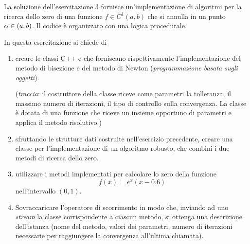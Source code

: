 La soluzione dell'esercitazione 3 fornisce un'implementazione di
algoritmi per la ricerca dello zero di una funzione $f\in
C^{1}\left(a, b\right)$ che si annulla in
un punto $\alpha\in\left( a, b\right)$. Il codice \`e organizzato con una
logica procedurale.

In questa esercitazione si chiede di

\begin{enumerate}
\item creare le classi C++  e  che
forniscano rispettivamente l'implementazione del
metodo di bisezione e del metodo di Newton (\textit{programmazione
basata sugli oggetti}).

(\emph{traccia}: il costruttore della classe riceve come parametri la
tolleranza, il massimo numero di iterazioni, il tipo di controllo
sulla convergenza. La classe \`e dotata di una funzione 
che riceve un insieme opportuno di parametri e applica il metodo
risolutivo.)

\item sfruttando le strutture dati costruite nell'esercizio
precedente, creare una classe  per l'implementazione di
un algoritmo robusto, che combini i due metodi di ricerca dello zero.

\item utilizzare i metodi implementati per calcolare lo zero della
funzione
  \begin{equation*}
    f(x) = e^x (x - 0.6)
  \end{equation*}
  nell'intervallo $(0, 1)$.

\item Sovraccaricare l'operatore di scorrimento in modo che, inviando
  ad uno \emph{stream} la classe corrispondente a ciascun metodo, si
  ottenga una descrizione dell'istanza (nome del metodo, valori dei
  parametri, numero di iterazioni necessarie per raggiungere la
  convergenza all'ultima chiamata).

\end{enumerate}
